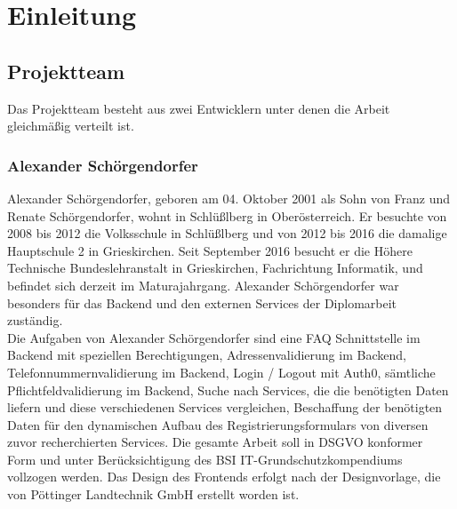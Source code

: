 \chapter{Einleitung} \label{sec:einleitung}
\section{Projektteam}
Das Projektteam besteht aus zwei Entwicklern unter denen die Arbeit gleichmäßig verteilt ist.
\subsection{Alexander Schörgendorfer}
Alexander Schörgendorfer, geboren am 04. Oktober 2001 als Sohn von Franz und Renate Schörgendorfer, wohnt in Schlüßlberg in Oberösterreich. Er besuchte von 2008 bis 2012 die Volksschule in Schlüßlberg und von 2012 bis 2016 die damalige Hauptschule 2 in Grieskirchen. Seit September 2016 besucht er die Höhere Technische Bundeslehranstalt in Grieskirchen, Fachrichtung Informatik, und befindet sich derzeit im Maturajahrgang. Alexander Schörgendorfer war besonders für das Backend und den externen Services der Diplomarbeit zuständig.\\
Die Aufgaben von Alexander Schörgendorfer sind eine FAQ Schnittstelle im Backend mit speziellen Berechtigungen, Adressenvalidierung im Backend, Telefonnummernvalidierung im Backend, Login / Logout mit Auth0, sämtliche Pflichtfeldvalidierung im Backend, Suche nach Services, die die benötigten Daten liefern und diese verschiedenen Services vergleichen, Beschaffung der benötigten Daten für den dynamischen Aufbau des Registrierungsformulars von diversen zuvor recherchierten Services. Die gesamte Arbeit soll in DSGVO konformer Form und unter Berücksichtigung des BSI IT-Grundschutzkompendiums vollzogen werden. Das Design des Frontends erfolgt nach der Designvorlage, die von Pöttinger Landtechnik GmbH erstellt worden ist.

